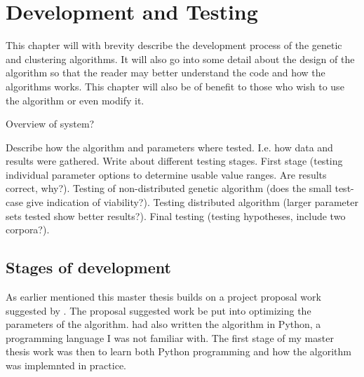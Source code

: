 
\chapter{Development and Testing} %

\label{Development} %



This chapter will with brevity describe the development process of the genetic and clustering algorithms. It will also go into some detail about the design of the algorithm so that the reader may better understand the code and how the algorithms works. This chapter will also be of benefit to those who wish to use the algorithm or even modify it.

Overview of system?

Describe how the algorithm and parameters where tested. I.e. how data and results were gathered. Write about different testing stages. First stage (testing individual parameter options to determine usable value ranges. Are results correct, why?). Testing of non-distributed genetic algorithm (does the small test-case give indication of viability?). Testing distributed algorithm (larger parameter sets tested show better results?). Final testing (testing hypotheses, include two corpora?).

\section{Stages of development}

As earlier mentioned this master thesis builds on a project proposal work suggested by \supervisor. The proposal suggested work be put into optimizing the parameters of the \STC algorithm. \supervisor had also written the algorithm in Python, a programming language I was not familiar with. The first stage of my master thesis work was then to learn both Python programming and how the \STC algorithm was implemnted in practice.

